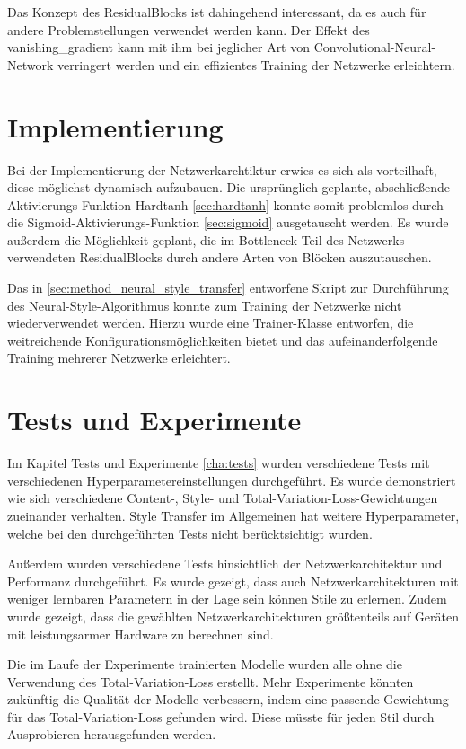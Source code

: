 Das Konzept des ResidualBlocks ist dahingehend interessant, da es auch für andere Problemstellungen verwendet werden kann. Der Effekt des \gls{vanishing_gradient} kann mit ihm bei jeglicher Art von Convolutional-Neural-Network verringert werden und ein effizientes Training der Netzwerke erleichtern.

\section{Implementierung}

Bei der Implementierung der Netzwerkarchtiktur erwies es sich als vorteilhaft, diese möglichst dynamisch aufzubauen. Die ursprünglich geplante, abschließende Aktivierungs-Funktion Hardtanh \ref{sec:hardtanh} konnte somit problemlos durch die Sigmoid-Aktivierungs-Funktion \ref{sec:sigmoid} ausgetauscht werden. Es wurde außerdem die Möglichkeit geplant, die im Bottleneck-Teil des Netzwerks verwendeten ResidualBlocks durch andere Arten von Blöcken auszutauschen.

Das in \ref{sec:method_neural_style_transfer} entworfene Skript zur Durchführung des Neural-Style-Algorithmus konnte zum Training der Netzwerke nicht wiederverwendet werden. Hierzu wurde eine Trainer-Klasse entworfen, die weitreichende Konfigurationsmöglichkeiten bietet und das aufeinanderfolgende Training mehrerer Netzwerke erleichtert.

\section{Tests und Experimente}

Im Kapitel Tests und Experimente \ref{cha:tests} wurden verschiedene Tests mit verschiedenen Hyperparametereinstellungen durchgeführt.
Es wurde demonstriert wie sich verschiedene Content-, Style- und Total-Variation-Loss-Gewichtungen zueinander verhalten. Style Transfer im Allgemeinen hat weitere Hyperparameter, welche bei den durchgeführten Tests nicht berücktsichtigt wurden.

Außerdem wurden verschiedene Tests hinsichtlich der Netzwerkarchitektur und Performanz durchgeführt. Es wurde gezeigt, dass auch Netzwerkarchitekturen mit weniger lernbaren Parametern in der Lage sein können Stile zu erlernen. Zudem wurde gezeigt, dass die gewählten Netzwerkarchitekturen größtenteils auf Geräten mit leistungsarmer Hardware zu berechnen sind.

Die im Laufe der Experimente trainierten Modelle wurden alle ohne die Verwendung des Total-Variation-Loss erstellt. Mehr Experimente könnten zukünftig die Qualität der Modelle verbessern, indem eine passende Gewichtung für das Total-Variation-Loss gefunden wird. Diese müsste für jeden Stil durch Ausprobieren herausgefunden werden.